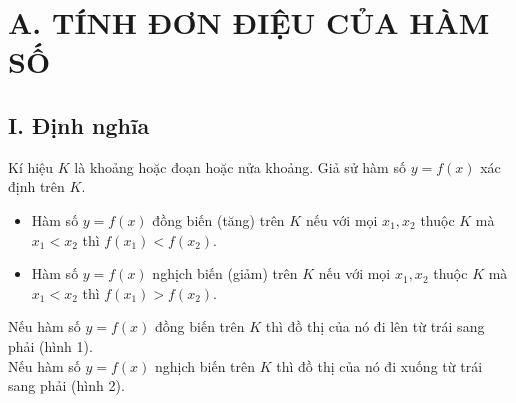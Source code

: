 \documentclass[12pt,a4paper]{extarticle}
\begin{document}
\makeheadbox[headerright={Chương 1},chude={Bài 1},tieude={Tính đơn điệu và cực trị của hàm số },dinhdang={Giải tích},lop={12 },gv={Nguyễn Lê Minh Ngọc}]

\vspace{2em}


\section*{A. TÍNH ĐƠN ĐIỆU CỦA HÀM SỐ}
\subsection*{I. Định nghĩa}
Kí hiệu $K$ là khoảng hoặc đoạn hoặc nửa khoảng. Giả sử hàm số $y = f(x)$ xác định trên $K$.
\begin{itemize}
	\item Hàm số $y = f(x)$ đồng biến (tăng) trên $K$ nếu với mọi $x_1, x_2$ thuộc $K$ mà $x_1 < x_2$ thì $f(x_1) < f(x_2)$.
	\item Hàm số $y = f(x)$ nghịch biến (giảm) trên $K$ nếu với mọi $x_1, x_2$ thuộc $K$ mà $x_1 < x_2$ thì $f(x_1) > f(x_2)$.
\end{itemize}
Nếu hàm số $y = f(x)$ đồng biến trên $K$ thì đồ thị của nó đi lên từ trái sang phải (hình 1).\\
Nếu hàm số $y = f(x)$ nghịch biến trên $K$ thì đồ thị của nó đi xuống từ trái sang phải (hình 2).
\end{document}
